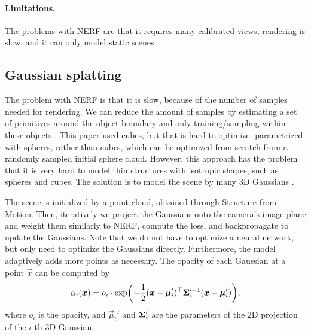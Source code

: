 \paragraph{Limitations.}

The problems with NERF are that it requires many calibrated views, rendering is slow, and it can
only model static scenes.

\subsection{Gaussian splatting}

The problem with NERF is that it is slow, because of the number of samples needed for rendering. We
can reduce the amount of samples by estimating a set of primitives around the object boundary and
only training/sampling within these objects \citep{lombardi2021mixture}. This paper used cubes, but
that is hard to optimize. \cite{lassner2021pulsar} parametrized with spheres, rather than cubes,
which can be optimized from scratch from a randomly sampled initial sphere cloud. However, this
approach has the problem that it is very hard to model thin structures with isotropic shapes, such
as spheres and cubes. The solution is to model the scene by many 3D Gaussians \citep{kerbl20233d}.

The scene is initialized by a point cloud, obtained through Structure from Motion. Then,
iteratively we project the Gaussians onto the camera's image plane and weight them similarly to
NERF, compute the loss, and backpropagate to update the Gaussians. Note that we do not have to
optimize a neural network, but only need to optimize the Gaussians directly. Furthermore, the model
adaptively adds more points as necessary. The opacity of each Gaussian at a point $\vec{x}$ can be computed by \[
    \alpha_i(\vec{x}) = o_i \cdot \exp\lft(-\frac{1}{2} \transpose{(\vec{x} - \vec{\mu}_i')} \inv{\mat{\Sigma}_i'} (\vec{x} - \vec{\mu}_i')\rgt),
\]
where $o_i$ is the opacity, and $\vec{\mu}_i'$ and $\bm{\Sigma}_i'$ are the parameters of the 2D
projection of the $i$-th 3D Gaussian.

